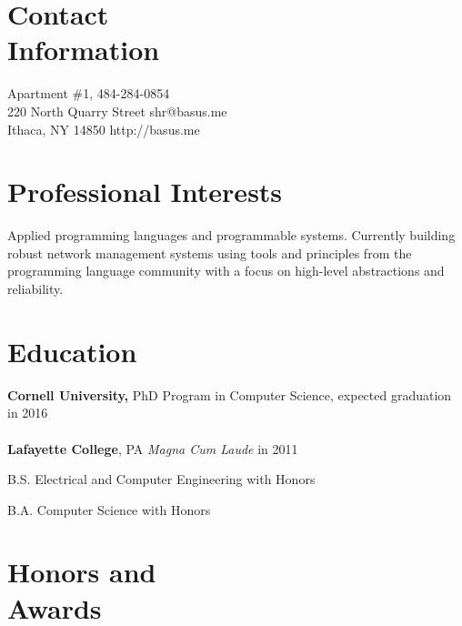 \documentclass[margin,line]{resume}
\begin{document}

\begin{resume}


    \section{Contact\\Information}

    Apartment \#1,                          \hfill 484-284-0854          \\
    220 North Quarry Street                 \hfill shr@basus.me          \\
    Ithaca, NY 14850                        \hfill http://basus.me

    \section{Professional Interests}
    Applied programming languages and programmable systems. Currently building
    robust network management systems using tools and principles from the
    programming language community with a focus on high-level abstractions and
    reliability.

    \section{Education}

    {\bf Cornell University,} PhD Program in Computer Science,
    expected graduation in 2016 \\
    \\
    {\bf Lafayette College}, PA \emph{Magna Cum Laude} in 2011%
    \begin{list2}
        \item B.S. Electrical and Computer Engineering with Honors
        \item B.A. Computer Science with Honors
    \end{list2}
    \section{Honors and\\Awards}


\end{resume}
\end{document}
